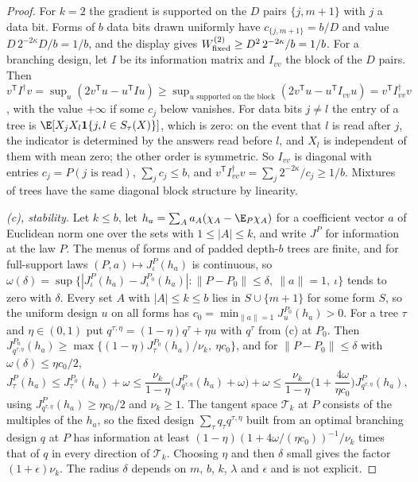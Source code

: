 \begin{proof}
For $k=2$ the gradient is supported on the $D$ pairs $\{j,m+1\}$ with $j$ a
data bit. Forms of $b$ data bits drawn uniformly have $c_{\{j,m+1\}}=b/D$ and
value $D\,2^{-2\kappa}D/b=1/b$, and the display gives
$W^{(2)}_{\rm fixed}\ge D^2\,2^{-2\kappa}/b=1/b$. For a branching design, let
$I$ be its information matrix and $I_{vv}$ the block of the $D$ pairs. Then
$v^{\mathsf T}I^\dagger v=\sup_u(2v^{\mathsf T}u-u^{\mathsf T}Iu)\ge\sup_{u\text{ supported on the block}}(2v^{\mathsf T}u-u^{\mathsf T}I_{vv}u)=v^{\mathsf T}I_{vv}^{\dagger}v$,
with the value $+\infty$ if some $c_j$ below vanishes.
For data bits $j\ne l$ the entry of a tree is
$\E[X_jX_l\mathbf 1\{j,l\in S_\tau(X)\}]$, which is zero: on the event that $l$
is read after $j$, the indicator is determined by the answers read before
$l$, and $X_l$ is independent of them with mean zero; the other order is
symmetric. So $I_{vv}$ is diagonal with entries $c_j=P(j\text{ is read})$,
$\sum_jc_j\le b$, and $v^{\mathsf T}I_{vv}^{\dagger}v=\sum_j2^{-2\kappa}/c_j\ge1/b$.
Mixtures of trees have the same diagonal block structure by linearity.

\emph{(c), stability.} Let $k\le b$, let $h_a=\sum_Aa_A(\chi_A-\E_P\chi_A)$
for a coefficient vector $a$ of Euclidean norm one over the sets with
$1\le|A|\le k$, and write $J^P$ for information at the law $P$. The menus of
forms and of padded depth-$b$ trees are finite, and for full-support laws
$(P,a)\mapsto J^P_\iota(h_a)$ is continuous, so
$\omega(\delta)=\sup\{|J^P_\iota(h_a)-J^{P_0}_\iota(h_a)|:\|P-P_0\|\le\delta,\ \|a\|=1,\ \iota\}$
tends to zero with $\delta$. Every set $A$ with $|A|\le k\le b$ lies in
$S\cup\{m+1\}$ for some form $S$, so the uniform design $u$ on all forms has
$c_0=\min_{\|a\|=1}J^{P_0}_u(h_a)>0$. For a tree $\tau$ and $\eta\in(0,1)$ put
$q^{\tau,\eta}=(1-\eta)q^\tau+\eta u$ with $q^\tau$ from (c) at $P_0$. Then
$J^{P_0}_{q^{\tau,\eta}}(h_a)\ge\max\{(1-\eta)J^{P_0}_\tau(h_a)/\nu_k,\ \eta c_0\}$,
and for $\|P-P_0\|\le\delta$ with $\omega(\delta)\le\eta c_0/2$,
\[
 J^P_\tau(h_a)\le J^{P_0}_\tau(h_a)+\omega\le\frac{\nu_k}{1-\eta}\big(J^P_{q^{\tau,\eta}}(h_a)+\omega\big)+\omega
 \le\frac{\nu_k}{1-\eta}\Big(1+\frac{4\omega}{\eta c_0}\Big)J^P_{q^{\tau,\eta}}(h_a),
\]
using $J^P_{q^{\tau,\eta}}(h_a)\ge\eta c_0/2$ and $\nu_k\ge1$. The tangent
space $\mathcal T_k$ at $P$ consists of the multiples of the $h_a$, so the
fixed design $\sum_\tau q_\tau q^{\tau,\eta}$ built from an optimal branching
design $q$ at $P$ has information at least
$(1-\eta)(1+4\omega/(\eta c_0))^{-1}/\nu_k$ times that of $q$ in every
direction of $\mathcal T_k$. Choosing $\eta$ and then $\delta$ small gives
the factor $(1+\epsilon)\nu_k$. The radius $\delta$ depends on $m$, $b$, $k$,
$\lambda$ and $\epsilon$ and is not explicit.


\end{proof}
